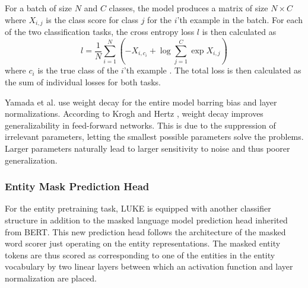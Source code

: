 \documentclass[main.tex]{subfiles}
\begin{document}
For a batch of size $ N $ and $ C $ classes, the model produces a matrix of size $ N\times C $ where $ X_{i, j} $ is the class score for class $ j $ for the $ i $'th example in the batch.
For each of the two classification tasks, the cross entropy loss $ l $ is then calculated as
\begin{equation}\label{eq:crossentropyloss}
    l = \frac{1}{N} \sum_{i=1}^N \left(
        -X_{i, c_i} + \log \sum_{j=1}^C \exp X_{i, j}
    \right)
\end{equation}
where $ c_i $ is the true class of the $ i $'th example \cite{pytorchcel}.
The total loss is then calculated as the sum of individual losses for both tasks.

Yamada et al. \cite{yamada2020luke} use weight decay for the entire model barring bias and layer normalizations.
According to Krogh and Hertz \cite{krogh1991weight}, weight decay improves generalizability in feed-forward networks.
This is due to the suppression of irrelevant parameters, letting the smallest possible parameters solve the problems.
Larger parameters naturally lead to larger sensitivity to noise and thus poorer generalization.

\subsubsection{Entity Mask Prediction Head}
For the entity pretraining task, LUKE is equipped with another classifier structure in addition to the masked language model prediction head inherited from BERT.
This new prediction head follows the architecture of the masked word scorer just operating on the entity representations.
The masked entity tokens are thus scored as corresponding to one of the entities in the entity vocabulary by two linear layers between which an activation function and layer normalization are placed.
\end{document}
